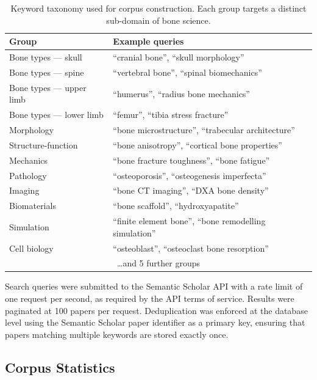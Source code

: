 \documentclass[12pt, a4paper]{article}
\begin{document}
\begin{table}[h]
\centering
\caption{Keyword taxonomy used for corpus construction. Each group targets a
distinct sub-domain of bone science.}
\label{tab:keywords}
\begin{tabular}{ll}
\toprule
\textbf{Group} & \textbf{Example queries} \\
\midrule
Bone types — skull       & ``cranial bone'', ``skull morphology'' \\
Bone types — spine       & ``vertebral bone'', ``spinal biomechanics'' \\
Bone types — upper limb  & ``humerus'', ``radius bone mechanics'' \\
Bone types — lower limb  & ``femur'', ``tibia stress fracture'' \\
Morphology               & ``bone microstructure'', ``trabecular architecture'' \\
Structure-function       & ``bone anisotropy'', ``cortical bone properties'' \\
Mechanics                & ``bone fracture toughness'', ``bone fatigue'' \\
Pathology                & ``osteoporosis'', ``osteogenesis imperfecta'' \\
Imaging                  & ``bone CT imaging'', ``DXA bone density'' \\
Biomaterials             & ``bone scaffold'', ``hydroxyapatite'' \\
Simulation               & ``finite element bone'', ``bone remodelling simulation'' \\
Cell biology             & ``osteoblast'', ``osteoclast bone resorption'' \\
\multicolumn{2}{c}{\ldots and 5 further groups} \\
\bottomrule
\end{tabular}
\end{table}

Search queries were submitted to the Semantic Scholar API with a rate limit of
one request per second, as required by the API terms of service.
Results were paginated at 100 papers per request.
Deduplication was enforced at the database level using the Semantic Scholar
paper identifier as a primary key, ensuring that papers matching multiple keywords
are stored exactly once.

\subsection{Corpus Statistics}
\end{document}
